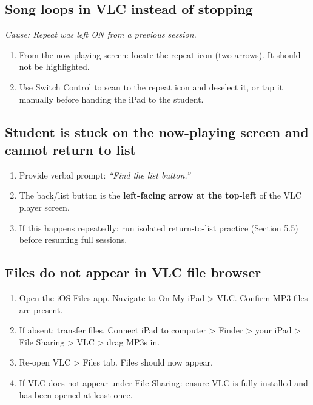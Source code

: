 \documentclass[justified,openright]{tufte-book}
\begin{document}
\subsection{Song loops in VLC instead of
stopping}\label{song-loops-in-vlc-instead-of-stopping}

\emph{Cause: Repeat was left ON from a previous session.}

\begin{enumerate}
\item
  From the now-playing screen: locate the repeat icon (two arrows). It
  should not be highlighted.
\item
  Use Switch Control to scan to the repeat icon and deselect it, or tap
  it manually before handing the iPad to the student.
\end{enumerate}

\subsection{Student is stuck on the now-playing screen and cannot
return to
list}\label{student-is-stuck-on-the-now-playing-screen-and-cannot-return-to-list}

\begin{enumerate}
\item
  Provide verbal prompt: \emph{``Find the list button.''}
\item
  The back/list button is the \textbf{left-facing arrow at the top-left}
  of the VLC player screen.
\item
  If this happens repeatedly: run isolated return-to-list practice
  (Section 5.5) before resuming full sessions.
\end{enumerate}

\subsection{Files do not appear in VLC file
browser}\label{files-do-not-appear-in-vlc-file-browser}

\begin{enumerate}
\item
  Open the iOS Files app. Navigate to On My iPad \textgreater{} VLC.
  Confirm MP3 files are present.
\item
  If absent: transfer files. Connect iPad to computer \textgreater{}
  Finder \textgreater{} your iPad \textgreater{} File Sharing
  \textgreater{} VLC \textgreater{} drag MP3s in.
\item
  Re-open VLC \textgreater{} Files tab. Files should now appear.
\item
  If VLC does not appear under File Sharing: ensure VLC is fully
  installed and has been opened at least once.
\end{enumerate}
\end{document}
